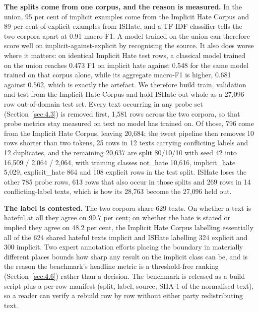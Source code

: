 \textbf{The splits come from one corpus, and the reason is measured.} In the union, 95 per cent of
implicit examples come from the Implicit Hate Corpus and 89 per cent of explicit examples from
ISHate, and a TF-IDF classifier tells the two corpora apart at 0.91 macro-F1. A model trained on the
union can therefore score well on implicit-against-explicit by recognising the source. It also does
worse where it matters: on identical Implicit Hate test rows, a classical model trained on the union
reaches 0.473 F1 on implicit hate against 0.548 for the same model trained on that corpus alone,
while its aggregate macro-F1 is higher, 0.681 against 0.562, which is exactly the artefact. We
therefore build train, validation and test from the Implicit Hate Corpus and hold ISHate out whole
as a 27,096-row out-of-domain test set. Every text occurring in any probe set
(Section~\ref{sec:4.3}) is removed first, 1,581 rows across the two corpora, so that probe metrics
stay measured on text no model has trained on. Of those, 796 come from the Implicit Hate Corpus,
leaving 20,684; the tweet pipeline then removes 10 rows shorter than two tokens, 25 rows in 12 texts
carrying conflicting labels and 12 duplicates, and the remaining 20,637 are split 80/10/10 with seed
42 into 16,509 / 2,064 / 2,064, with training classes not\_hate 10,616, implicit\_hate 5,029,
explicit\_hate 864 and 108 explicit rows in the test split. ISHate loses the other 785 probe rows,
613 rows that also occur in those splits and 269 rows in 14 conflicting-label texts, which is how
its 28,763 become the 27,096 held out.

\textbf{The label is contested.} The two corpora share 629 texts. On whether a text is hateful at
all they agree on 99.7 per cent; on whether the hate is stated or implied they agree on 48.2 per
cent, the Implicit Hate Corpus labelling essentially all of the 624 shared hateful texts implicit
and ISHate labelling 324 explicit and 300 implicit. Two expert annotation efforts placing the
boundary in materially different places bounds how sharp any result on the implicit class can be,
and is the reason the benchmark's headline metric is a threshold-free ranking
(Section~\ref{sec:4.6}) rather than a decision. The benchmark is released as a build script plus a
per-row manifest (split, label, source, SHA-1 of the normalised text), so a reader can verify a
rebuild row by row without either party redistributing text.
